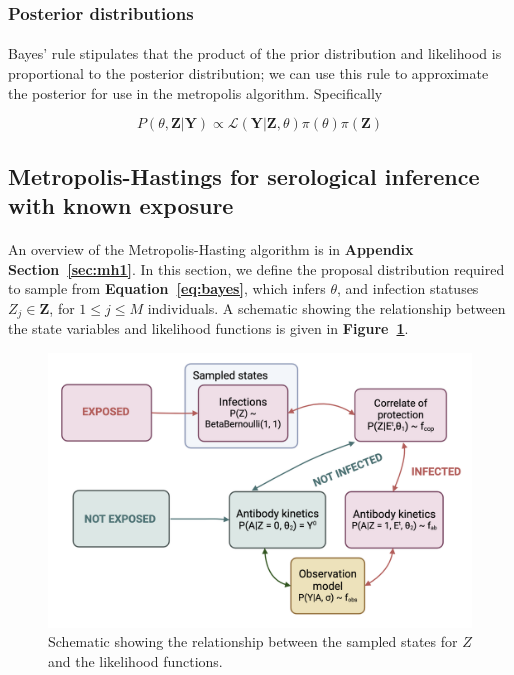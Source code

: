 % 

\subsubsection{Posterior distributions}

\paragraph{}Bayes' rule stipulates that the product of the prior distribution and likelihood is proportional to the posterior distribution; we can use this rule to approximate the posterior for use in the metropolis algorithm. Specifically 

\begin{equation}
\label{eq:bayes}
P(\theta, \mathbf{Z} | \mathbf{Y}) \propto \mathcal{L}(\mathbf{Y} | \mathbf{Z}, \theta)\pi(\theta)\pi(\mathbf{Z})
\end{equation}


\subsection{Metropolis-Hastings for serological inference with known exposure }

\paragraph{}An overview of the Metropolis-Hasting algorithm is in \textbf{Appendix Section~\ref{sec:mh1}}. In this section, we define the proposal distribution required to sample from \textbf{Equation~\ref{eq:bayes}}, which infers $\theta$, and infection statuses ${Z_j} \in \mathbf{Z}$, for $1 \leq j \leq M$ individuals. A schematic showing the relationship between the state variables and likelihood functions is given in \textbf{Figure~\ref{fig:sch_B}}.

\begin{figure}[H]
    \centering
    \includegraphics[width=1\textwidth]{sections/s3_known_exp/figs/sch_B.png}     \caption{Schematic showing the relationship between the sampled states for $Z$ and the likelihood functions.\label{fig:sch_B}}
\end{figure}


